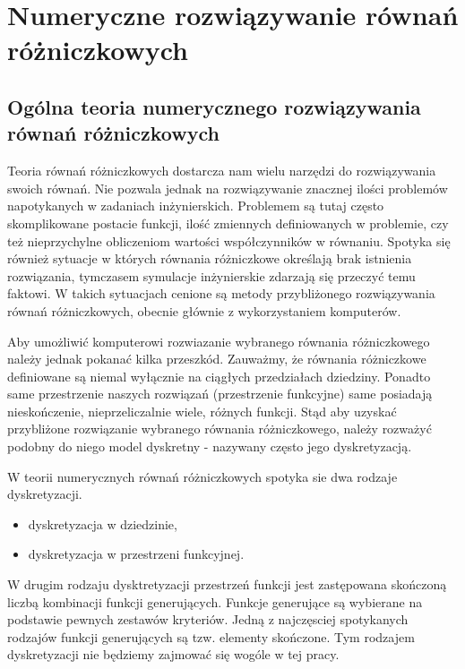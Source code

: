 \documentclass[12pt,a4paper]{report}
\begin{document}


\chapter{Numeryczne rozwiązywanie równań różniczkowych}

\section{Ogólna teoria numerycznego rozwiązywania równań różniczkowych}

Teoria równań różniczkowych dostarcza nam wielu narzędzi do rozwiązywania swoich równań. Nie pozwala jednak na rozwiązywanie znacznej ilości problemów napotykanych w zadaniach inżynierskich. Problemem są tutaj często skomplikowane postacie funkcji, ilość zmiennych definiowanych w problemie, czy też nieprzychylne obliczeniom wartości współczynników w równaniu. Spotyka się również sytuacje w których równania różniczkowe określają brak istnienia rozwiązania, tymczasem symulacje inżynierskie zdarzają się przeczyć temu faktowi. W takich sytuacjach cenione są metody przybliżonego rozwiązywania równań różniczkowych, obecnie głównie z wykorzystaniem komputerów. 

Aby umożliwić komputerowi rozwiazanie wybranego równania różniczkowego należy jednak pokanać kilka przeszkód. Zauważmy, że równania różniczkowe definiowane są niemal wyłącznie na ciągłych przedziałach dziedziny. Ponadto same przestrzenie naszych rozwiązań (przestrzenie funkcyjne) same posiadają nieskończenie, nieprzeliczalnie wiele, różnych funkcji. Stąd aby uzyskać przybliżone rozwiązanie wybranego równania różniczkowego, należy rozważyć podobny do niego model dyskretny - nazywany często jego dyskretyzacją. 

W teorii numerycznych równań różniczkowych spotyka sie dwa rodzaje dyskretyzacji.
\begin{itemize}
\item dyskretyzacja w dziedzinie,
\item dyskretyzacja w przestrzeni funkcyjnej.
\end{itemize}

W drugim rodzaju dysktretyzacji przestrzeń funkcji jest zastępowana skończoną liczbą kombinacji funkcji generujących. Funkcje generujące są wybierane na podstawie pewnych zestawów kryteriów. Jedną z najczęsciej spotykanych rodzajów funkcji generujących są tzw. elementy skończone. Tym rodzajem dyskretyzacji nie będziemy zajmować się wogóle w tej pracy.
\end{document}
